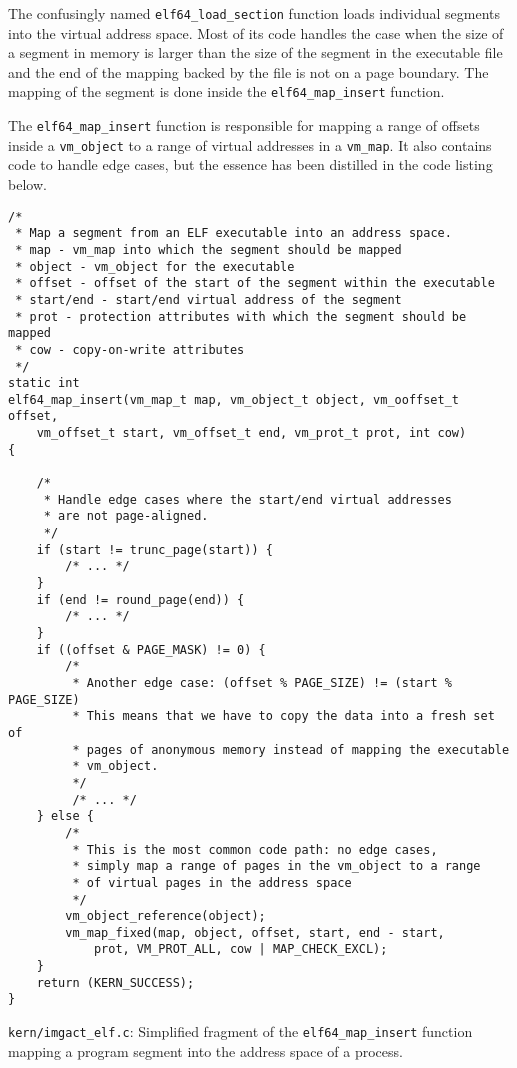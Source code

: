 \documentclass[shortabstract, english]{iithesis}
\begin{document}
The confusingly named \texttt{elf64_load_section} function loads
individual segments into the virtual address space. Most of its code handles the
case when the size of a segment in memory is larger than the size of the segment
in the executable file and the end of the mapping backed by the file is not on a
page boundary. The mapping of the segment is done inside the
\texttt{elf64_map_insert} function.

The \texttt{elf64_map_insert} function is responsible for mapping a range
of offsets inside a \texttt{vm_object} to a range of virtual addresses in
a \texttt{vm_map}. It also contains code to handle edge cases, but the
essence has been distilled in the code listing below.

\begin{listing}[H]
\begin{verbatim}
/*
 * Map a segment from an ELF executable into an address space.
 * map - vm_map into which the segment should be mapped
 * object - vm_object for the executable
 * offset - offset of the start of the segment within the executable
 * start/end - start/end virtual address of the segment
 * prot - protection attributes with which the segment should be mapped
 * cow - copy-on-write attributes
 */
static int
elf64_map_insert(vm_map_t map, vm_object_t object, vm_ooffset_t offset,
    vm_offset_t start, vm_offset_t end, vm_prot_t prot, int cow)
{

    /*
     * Handle edge cases where the start/end virtual addresses
     * are not page-aligned.
     */
    if (start != trunc_page(start)) {
        /* ... */
    }
    if (end != round_page(end)) {
        /* ... */
    }
    if ((offset & PAGE_MASK) != 0) {
        /*
         * Another edge case: (offset % PAGE_SIZE) != (start % PAGE_SIZE)
         * This means that we have to copy the data into a fresh set of
         * pages of anonymous memory instead of mapping the executable
         * vm_object.
         */
         /* ... */
    } else {
        /*
         * This is the most common code path: no edge cases,
         * simply map a range of pages in the vm_object to a range
         * of virtual pages in the address space
         */
        vm_object_reference(object);
        vm_map_fixed(map, object, offset, start, end - start,
            prot, VM_PROT_ALL, cow | MAP_CHECK_EXCL);
    }
    return (KERN_SUCCESS);
}
\end{verbatim}
  \caption{\texttt{kern/imgact\_elf.c}: Simplified fragment of the
    \texttt{elf64_map_insert} function mapping a program segment into the
    address space of a process.}
\end{listing}
\end{document}
